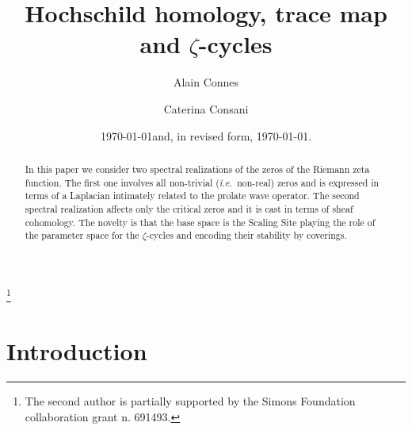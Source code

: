 \documentclass{pspum-l}
\theoremstyle{definition}
\theoremstyle{remark}
\numberwithin{equation}{section}
\newcommand{\ie}{{\it i.e.\/}\ }
\begin{document}
\title{Hochschild homology, trace map  and $\zeta$-cycles}

\author{Alain Connes}
\address{Coll\`ege de France and IHES, France}

\author{Caterina Consani}
\address{Department of Mathematics, Johns Hopkins University,
Baltimore MD 21218, USA}
\thanks{The second author is partially supported by the Simons Foundation collaboration grant n. 691493.}

\date{\today and, in revised form, \today.}

\dedicatory{}


\begin{abstract}In this paper we   consider two spectral realizations of the zeros of the Riemann zeta function. The first one involves all non-trivial (\ie non-real) zeros and  is expressed in terms of a Laplacian intimately related to the prolate wave operator. The  second spectral realization  affects only the critical zeros and it is  cast in terms of sheaf cohomology. The novelty is that the base space is the Scaling Site playing the role of the parameter space for the $\zeta$-cycles and encoding their stability by coverings. 
\end{abstract}


\maketitle


\section{Introduction}
\end{document}
